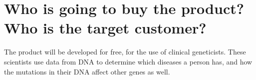 \section{Who is going to buy the product? Who is the target customer?}
The product will be developed for free, for the use of clinical geneticists. These scientists use data from DNA to determine which diseases a person has, and how the mutations in their DNA affect other genes as well.